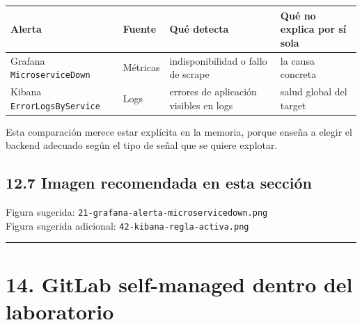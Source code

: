 \documentclass[
a4paper,
12pt]{report}
\begin{document}
{\def\LTcaptype{table} %
\begin{longtable}[]{@{}
  >{\raggedright\arraybackslash}p{}
  >{\raggedright\arraybackslash}p{}
  >{\raggedright\arraybackslash}p{}
  >{\raggedright\arraybackslash}p{}@{}}
\toprule\noalign{}
\begin{minipage}[b]{\linewidth}\raggedright
Alerta
\end{minipage} & \begin{minipage}[b]{\linewidth}\raggedright
Fuente
\end{minipage} & \begin{minipage}[b]{\linewidth}\raggedright
Qué detecta
\end{minipage} & \begin{minipage}[b]{\linewidth}\raggedright
Qué no explica por sí sola
\end{minipage} \\
\midrule\noalign{}
\endhead
\bottomrule\noalign{}
\endlastfoot
Grafana \texttt{MicroserviceDown} & Métricas & indisponibilidad o fallo
de scrape & la causa concreta \\
Kibana \texttt{ErrorLogsByService} & Logs & errores de aplicación
visibles en logs & salud global del target \\
\end{longtable}
}

Esta comparación merece estar explícita en la memoria, porque enseña a
elegir el backend adecuado según el tipo de señal que se quiere
explotar.

\section{12.7 Imagen recomendada en esta
sección}\label{imagen-recomendada-en-esta-secciuxf3n-6}

Figura sugerida: \texttt{21-grafana-alerta-microservicedown.png}\\
Figura sugerida adicional: \texttt{42-kibana-regla-activa.png}

\begin{center}\rule{0.5\linewidth}{0.5pt}\end{center}

\chapter{14. GitLab self-managed dentro del
laboratorio}\label{gitlab-self-managed-dentro-del-laboratorio}
\end{document}
